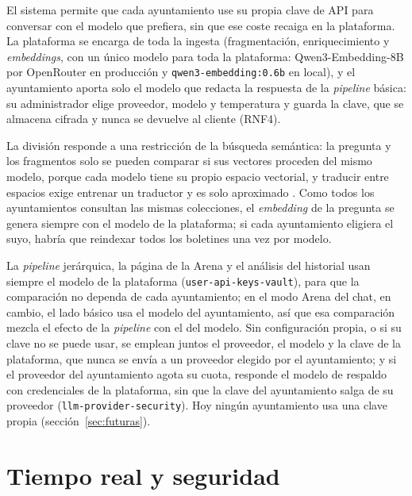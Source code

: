El sistema permite que cada ayuntamiento use su propia clave de API para conversar con el modelo que prefiera, sin que ese coste recaiga en la plataforma. La plataforma se encarga de toda la ingesta (fragmentación, enriquecimiento y \emph{embeddings}, con un único modelo para toda la plataforma: Qwen3-Embedding-8B por OpenRouter en producción y \texttt{qwen3-embedding:0.6b} en local), y el ayuntamiento aporta solo el modelo que redacta la respuesta de la \emph{pipeline} básica: su administrador elige proveedor, modelo y temperatura y guarda la clave, que se almacena cifrada y nunca se devuelve al cliente (RNF4).

La división responde a una restricción de la búsqueda semántica: la pregunta y los fragmentos solo se pueden comparar si sus vectores proceden del mismo modelo, porque cada modelo tiene su propio espacio vectorial, y traducir entre espacios exige entrenar un traductor y es solo aproximado \cite{jha2025vec2vec}. Como todos los ayuntamientos consultan las mismas colecciones, el \emph{embedding} de la pregunta se genera siempre con el modelo de la plataforma; si cada ayuntamiento eligiera el suyo, habría que reindexar todos los boletines una vez por modelo.

La \emph{pipeline} jerárquica, la página de la Arena y el análisis del historial usan siempre el modelo de la plataforma (\texttt{user-api-keys-vault}), para que la comparación no dependa de cada ayuntamiento; en el modo Arena del chat, en cambio, el lado básico usa el modelo del ayuntamiento, así que esa comparación mezcla el efecto de la \emph{pipeline} con el del modelo. Sin configuración propia, o si su clave no se puede usar, se emplean juntos el proveedor, el modelo y la clave de la plataforma, que nunca se envía a un proveedor elegido por el ayuntamiento; y si el proveedor del ayuntamiento agota su cuota, responde el modelo de respaldo con credenciales de la plataforma, sin que la clave del ayuntamiento salga de su proveedor (\texttt{llm-provider-security}). Hoy ningún ayuntamiento usa una clave propia (sección~\ref{sec:futuras}).

\section{Tiempo real y seguridad}
\label{sec:seguridad}

